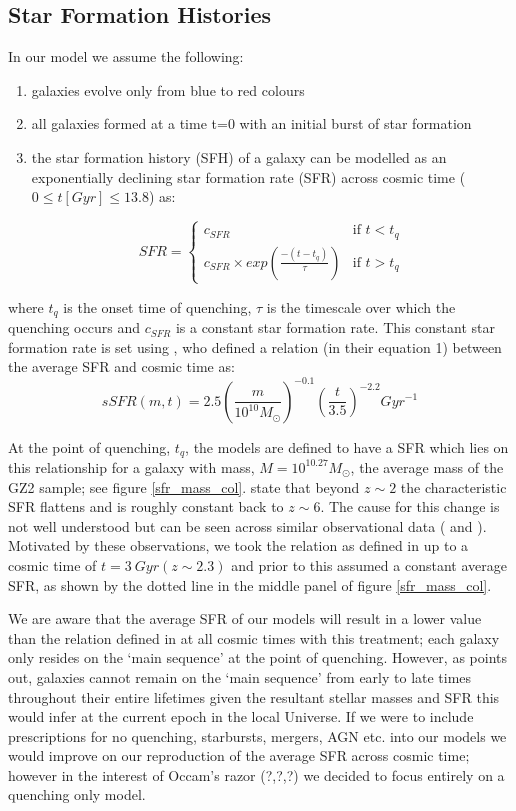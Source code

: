 \documentclass{mn2e}
\begin{document}
\subsection{Star Formation Histories}\label{sfh}
In our model we assume the following:
\begin{enumerate}
\item galaxies evolve only from blue to red colours
\item all galaxies formed at a time t=0 with an initial burst of star formation 
\item the star formation history (SFH) of a galaxy can be modelled as an exponentially declining star formation rate (SFR) across cosmic time ($0 \leq t [Gyr] \leq 13.8$) as:

\[
SFR = 
\begin{cases}
c_{SFR} & \text{if } t < t_{q} \\
c_{SFR} \times exp{\left( \frac{-(t-t_{q})}{\tau}\right)} & \text{if } t > t_{q}
\end{cases}
\]
\end{enumerate}
where $t_{q}$ is the onset time of quenching, $\tau$ is the timescale over which the quenching occurs and $c_{SFR}$ is a constant star formation rate. This constant star formation rate is set using \citet{Peng}, who defined a relation (in their equation 1) between the average SFR and cosmic time as:
\begin{equation*}
sSFR(m,t) = 2.5 \left( \frac{m}{10^{10} M_{\odot}} \right)^{-0.1} \left(\frac{t}{3.5}\right)^{-2.2} Gyr^{-1}
\end{equation*}



At the point of quenching, $t_{q}$, the models are defined to have a SFR which lies on this relationship for a galaxy with mass, $M = 10^{10.27} M_{\odot}$, the average mass of the GZ2 sample; see figure \ref{sfr_mass_col}. \citet{Peng} state that beyond $z \sim 2$ the characteristic SFR flattens and is roughly constant back to $z\sim6$. The cause for this change is not well understood but can be seen across similar observational data (\cite{Gonzalez} and \cite{Beth}). Motivated by these observations, we took the relation as defined in \citet{Peng} up to a cosmic time of $t=3~Gyr (z \sim 2.3)$ and prior to this assumed a constant average SFR, as shown by the dotted line in the middle panel of figure \ref{sfr_mass_col}.
 
We are aware that the average SFR of our models will result in a lower value than the relation defined in \citet{Peng} at all cosmic times with this treatment; each galaxy only resides on the `main sequence' at the point of quenching. However, as \citet{Beth} points out, galaxies cannot remain on the `main sequence' from early to late times throughout their entire lifetimes given the resultant stellar masses and SFR this would infer at the current epoch in the local Universe. If we were to include prescriptions for no quenching, starbursts, mergers, AGN etc. into our models we would improve on our reproduction of the average SFR across cosmic time; however in the interest of Occam's razor (?,?,?) we decided to focus entirely on a quenching only model. 
\end{document}
